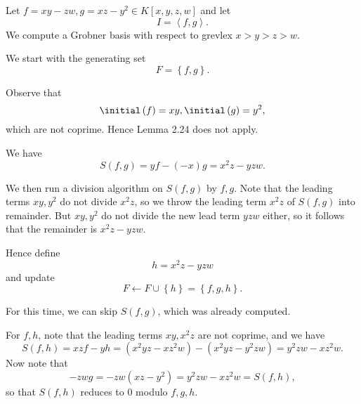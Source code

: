 \documentclass[co439]{subfiles}
\begin{document}
    \begin{example}{}
        Let $f=xy-zw, g=xz-y^{2}\in K\left[ x,y,z,w \right]$ and let
        \begin{equation*}
            I = \left< f,g \right>. 
        \end{equation*}
        We compute a Grobner basis with respect to grevlex $x>y>z>w$.

        We start with the generating set
        \begin{equation*}
            F = \left\lbrace f,g \right\rbrace.
        \end{equation*}

        Observe that
        \begin{equation*}
            \initial\left( f \right) = xy, \initial\left( g \right) = y^{2},
        \end{equation*}
        which are not coprime. Hence Lemma 2.24 does not apply.

        We have
        \begin{equation*}
            S\left( f,g \right) = yf - \left( -x \right)g = x^{2}z-yzw.
        \end{equation*}

        We then run a division algorithm on $S\left( f,g \right)$ by $f,g$. Note that the leading terms $xy,y^{2}$ do not divide $x^{2}z$, so we throw the leading term $x^{2}z$ of $S\left( f,g \right)$ into remainder. But $xy,y^{2}$ do not divide the new lead term $yzw$ either, so it follows that the remainder is $x^{2}z-yzw$.

        Hence define
        \begin{equation*}
            h = x^{2}z-yzw
        \end{equation*}
        and update
        \begin{equation*}
            F\leftarrow F\cup\left\lbrace h \right\rbrace = \left\lbrace f,g,h \right\rbrace.
        \end{equation*}

        For this time, we can skip $S\left( f,g \right)$, which was already computed.

        For $f,h$, note that the leading terms $xy, x^{2}z$ are not coprime, and we have
        \begin{equation*}
            S\left( f,h \right) = xzf - yh = \left( x^{2}yz-xz^{2}w \right) - \left( x^{2}yz-y^{2}zw \right) = y^{2}zw-xz^{2}w.
        \end{equation*}
        Now note that
        \begin{equation*}
            -zwg = -zw\left( xz-y^{2} \right) = y^{2}zw - xz^{2}w = S\left( f,h \right),
        \end{equation*}
        so that $S\left( f,h \right)$ reduces to $0$ modulo $f,g,h$.


\end{example}
\end{document}
